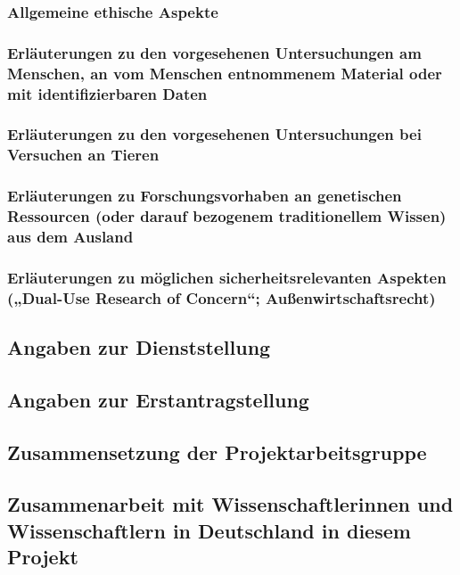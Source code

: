 \documentclass[de]{dfg-proposal}
\begin{document}
            \subsubsection{Allgemeine ethische Aspekte}

            \subsubsection{Erläuterungen zu den vorgesehenen Untersuchungen am Menschen, an vom Menschen entnommenem Material oder mit identifizierbaren Daten}

            \subsubsection{Erläuterungen zu den vorgesehenen Untersuchungen bei Versuchen an Tieren}

            \subsubsection{Erläuterungen zu Forschungsvorhaben an genetischen Ressourcen (oder darauf bezogenem traditionellem Wissen) aus dem Ausland}

            \subsubsection{Erläuterungen zu möglichen sicherheitsrelevanten Aspekten („Dual-Use Research of Concern“; Außenwirtschaftsrecht)}

        \subsection{Angaben zur Dienststellung}

        \subsection{Angaben zur Erstantragstellung}

        \subsection{Zusammensetzung der Projektarbeitsgruppe}

        \subsection{Zusammenarbeit mit Wissenschaftlerinnen und Wissenschaftlern in Deutschland in diesem Projekt}
\end{document}
